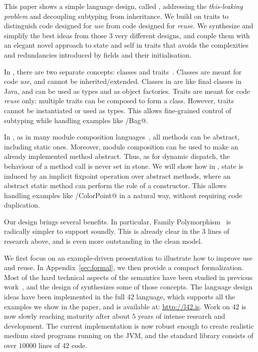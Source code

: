 This paper shows a simple language design, called \name,
addressing the \emph{this-leaking problem} and decoupling subtyping from inheritance.
We build on traits to distinguish code designed for
\emph{use} from code designed for \emph{reuse}.
We synthesize and simplify the best ideas from those $3$ very
different designs, and couple them with an elegant novel approach to
state and self  in traits that avoids the complexities and redundancies introduced by fields and their initialisation.

In \name, there are two separate concepts: classes
and traits~\cite{ducasse2006traits}. Classes are meant for code \emph{use}, and cannot be inherited/extended. Classes in \name are like final classes in
Java, and can be used as types and as object factories. Traits are meant for code \emph{reuse} only: multiple traits can be
composed to form a class. However, traits 
cannot be instantiated or used as types.
This allows fine-grained control of subtyping while handling examples like \Q@Set/Bag@.

In \name, as in many module composition languages~\cite{ancona2002calculus},
all methods can be abstract, including static ones.
Moreover, module composition can be used to make
an already implemented method abstract.
Thus, as for dynamic dispatch, the behaviour of a method call is never set in stone.
We will show how in \name, state is induced by an implicit fixpoint operation over abstract methods,
where an abstract static method can perform the role of a constructor.
This allows handling examples like \Q@Point/ColorPoint@ in a natural way, without requiring code duplication.

Our design brings several benefits. In particular, 
Family Polymorphism~\cite{ernst2004expression} is
radically simpler to support soundly.
This is already clear in the $3$ lines of
research above, and is even more outstanding in the clean \name model.

We first focus on an example-driven presentation to illustrate how to
improve use and reuse. 
In Appendix~\ref{sec:formal}, we then provide a compact formalization.
Most of the hard technical aspects of the
semantics have been studied in previous 
work~\cite{Bettini:2010:ISP:1774088.1774530,BETTINI2013521,Bettini2015282,KrogdahlMS09,DBLP:journals/taosd/AxelsenSKM12,DBLP:conf/gpce/AxelsenK12,deep,servetto2014meta,fjig},
and the design of \name synthesizes some of those concepts.
The language design ideas have been implemented in the full 42 language, which supports all
the examples we show in the paper, and is available at: \url{http://l42.is}.
Work on 42 is now slowly reaching maturity after about $5$ years of
intense research and development. The current implementation 
is now robust enough to create realistic medium sized programs running 
on the JVM, and the standard library consists of over $10000$ lines of
42 code. 


